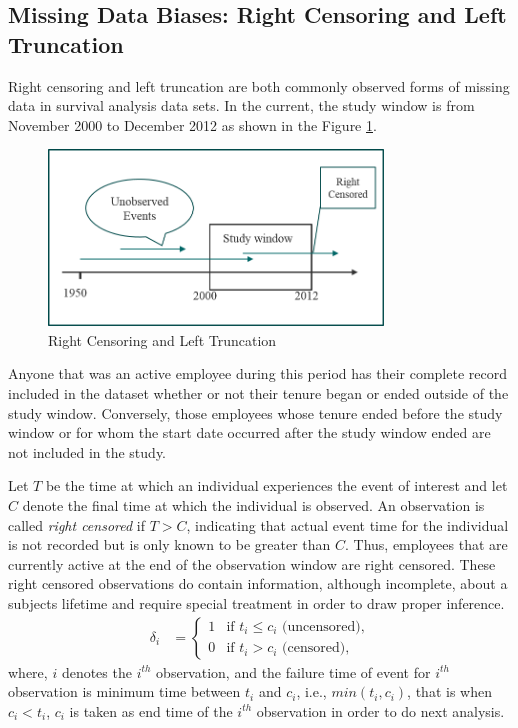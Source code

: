 \subsection{Missing Data Biases: Right Censoring and Left Truncation}\label{bias}
Right censoring and left truncation are both commonly observed forms of missing data in survival analysis data sets. In the current, the study window is from November 2000 to December 2012 as shown in the Figure \ref{fig:1}.
\begin{figure}[htbp]
	\centering
	\includegraphics[width=3.5in]{fig1.png}
	\caption{Right Censoring and Left Truncation}
	\label{fig:1}
\end{figure}
Anyone that was an active employee during this period has their complete record included in the dataset whether or not their tenure began or ended outside of the study window.  Conversely, those employees whose tenure ended before the study window or for whom the start date occurred after the study window ended are not included in the study.

Let $T$ be the time at which  an individual experiences the event of interest and let $C$ denote the final time at which the individual is observed. An observation is called {\it right censored} if $T> C$, indicating that actual event time for the individual is not recorded but is only known to be greater than $C$. Thus, employees that are currently active at the end of the observation window are right censored. These right censored observations do contain information, although incomplete, about a subjects lifetime and require special treatment in order to draw proper inference.
\begin{align*}
\delta_i&=
\begin{cases}
1   &\text{if  }  t_i \leq c_i \text{ (uncensored),}\\
0   &\text{if  }  t_i > c_i \text{ (censored),}
\end{cases}
\end{align*}
where, $i$ denotes the $i^{th}$ observation, and the failure time of event for $i^{th}$ observation is minimum time between $t_i$ and $c_i$, i.e., $min(t_i, c_i)$, that is when $c_i <t_i $, $c_i$ is taken as end time of the $i^{th}$ observation in order to do next analysis.

